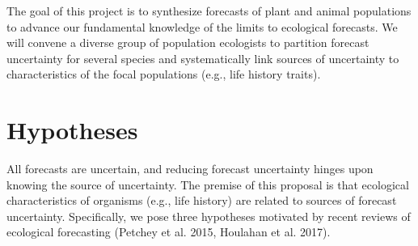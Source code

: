 \documentclass[12pt,]{article}
\begin{document}
The goal of this project is to synthesize forecasts of plant and animal
populations to advance our fundamental knowledge of the limits to
ecological forecasts. We will convene a diverse group of population
ecologists to partition forecast uncertainty for several species and
systematically link sources of uncertainty to characteristics of the
focal populations (e.g., life history traits).

\section{Hypotheses}

All forecasts are uncertain, and reducing forecast uncertainty hinges
upon knowing the source of uncertainty. The premise of this proposal is
that ecological characteristics of organisms (e.g., life history) are
related to sources of forecast uncertainty. Specifically, we pose three
hypotheses motivated by recent reviews of ecological forecasting
(Petchey et al. 2015, Houlahan et al. 2017).
\end{document}
